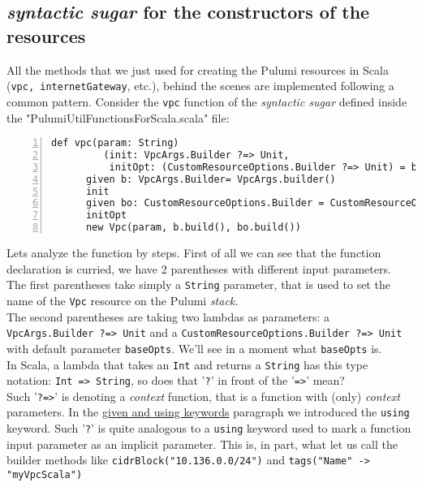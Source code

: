 \subsection{\textit{syntactic sugar} for the constructors of the resources}
All the methods that we just used for creating the Pulumi resources in Scala (\texttt{vpc, internetGateway}, etc.), behind the scenes are implemented following a common pattern.
Consider the \texttt{vpc} function of the \textit{syntactic sugar} defined inside the "PulumiUtilFunctionsForScala.scala" file:\\
\begin{minipage}{\linewidth}
\begin{lstlisting}[numbers=left, numberstyle=\tiny, numbersep=-5pt, stepnumber=1]
  def vpc(param: String)
         (init: VpcArgs.Builder ?=> Unit,
          initOpt: (CustomResourceOptions.Builder ?=> Unit) = baseOpts): Vpc =
	  given b: VpcArgs.Builder= VpcArgs.builder()
	  init
	  given bo: CustomResourceOptions.Builder = CustomResourceOptions.builder()
	  initOpt
	  new Vpc(param, b.build(), bo.build())
\end{lstlisting}
\end{minipage}
Lets analyze the function by steps.
First of all we can see that the function declaration is curried, we have 2 parentheses with different input parameters.\\
The first parentheses take simply a \texttt{String} parameter, that is used to set the name of the \texttt{Vpc} resource on the Pulumi \textit{stack}.\\
The second parentheses are taking two lambdas as parameters: a \texttt{VpcArgs.Builder ?=> Unit}  and a \texttt{CustomResourceOptions.Builder ?=> Unit} with default parameter \texttt{baseOpts}. We'll see in a moment what \texttt{baseOpts} is.\\
In Scala, a lambda that takes an \texttt{Int} and returns a \texttt{String} has this type notation: \texttt{Int => String}, so does that '\texttt{?}' in front of the '\texttt{=>}' mean?\\
Such '\texttt{?=>}' is denoting a \textit{context} function, that is a function with (only) \textit{context} parameters.
In the \hyperref[par:given-using]{given and using keywords} paragraph we introduced the \texttt{using} keyword.
Such '\texttt{?}' is quite analogous to a \texttt{using} keyword used to mark a function input parameter as an implicit parameter.
This is, in part, what let us call the builder methods like \texttt{cidrBlock("10.136.0.0/24")} and \texttt{tags("Name" -> "myVpcScala")} 
